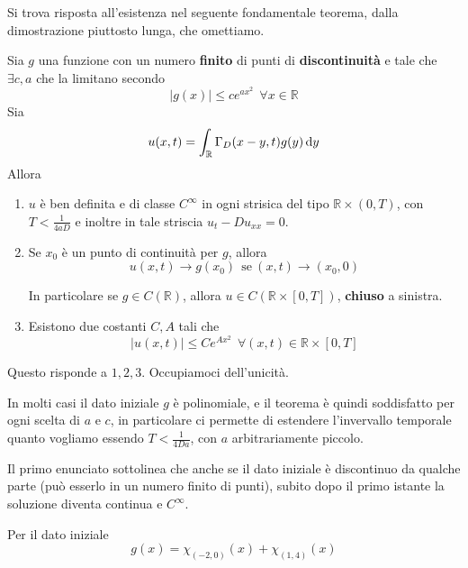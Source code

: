 Si trova risposta all'esistenza nel seguente fondamentale teorema, dalla dimostrazione piuttosto lunga, che omettiamo.
\begin{theorem}
    [di Esistenza] Sia $g$ una funzione con un numero \textbf{finito} di punti di \textbf{discontinuità} e tale che $\exists c,a$ che la limitano secondo
    \begin{equation}
        \tag{G}
        | g(x)| \leq ce^{ax^{2}} \ \ \forall x\in \mathbb{R}
        \label{eq:pcg-diffusione-condizione-g}
    \end{equation}
    Sia
    \begin{equation*}
        u(x,t) =\int _{\mathbb{R}} \Gamma _{D}(x-y,t) g(y) \,\mathrm d y
    \end{equation*}
    Allora
    \begin{enumerate}
        \item $u$ è ben definita e di classe $C^{\infty }$ in ogni strisica del tipo $\mathbb{R} \times (0,T)$, con $T< \frac{1}{4aD}$ e inoltre in tale striscia $u_{t} -Du_{xx} =0$.
        \item Se $x_{0}$ è un punto di continuità per $g$, allora
              \begin{equation*}
                  u(x,t)\rightarrow g(x_{0}) \ \ \text{se} \ (x,t)\rightarrow (x_{0},0)
              \end{equation*}

              In particolare se $g\in C(\mathbb{R})$, allora $u\in C(\mathbb{R} \times [ 0,T])$, \textbf{chiuso} a sinistra.
        \item Esistono due costanti $C,A$ tali che
              \begin{equation*}
                  | u(x,t)| \leq Ce^{Ax^{2}} \ \ \forall (x,t) \in \mathbb{R} \times [ 0,T]
              \end{equation*}
    \end{enumerate}
\end{theorem}

Questo risponde a $1,2,3$. Occupiamoci dell'unicità.
\begin{oss}
    In molti casi il dato iniziale $g$ è polinomiale, e il teorema è quindi soddisfatto per ogni scelta di $a$ e $c$, in particolare ci permette di estendere l'invervallo temporale quanto vogliamo essendo $T< \frac{1}{4Da}$, con $a$ arbitrariamente piccolo.
\end{oss}
\begin{oss}
     Il primo enunciato sottolinea che anche se il dato iniziale è discontinuo da qualche parte (può esserlo in un numero finito di punti), subito dopo il primo istante la soluzione diventa continua e $C^{\infty }$.
\end{oss}
Per il dato iniziale
\begin{equation*}
    g(x) =\chi _{(-2,0)}(x) +\chi _{(1,4)}(x)
\end{equation*}

